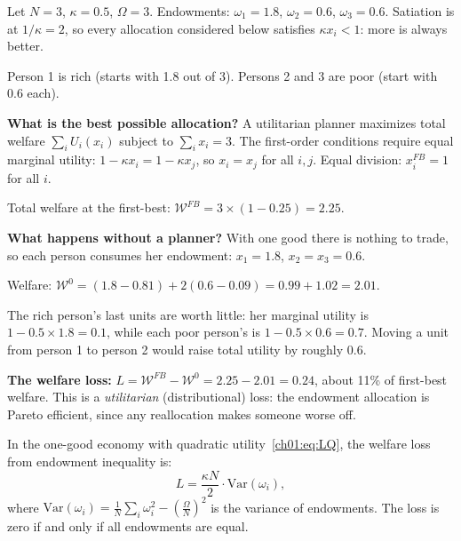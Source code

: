 \documentclass[../structural_economics_book.tex]{subfiles}
\begin{document}
\begin{example}\label{ch01:ex:one_good}
Let $N = 3$, $\kappa = 0.5$, $\Omega = 3$. Endowments: $\omega_1 = 1.8$, $\omega_2 = 0.6$, $\omega_3 = 0.6$. Satiation is at $1/\kappa = 2$, so every allocation considered below satisfies $\kappa x_i < 1$: more is always better.

Person 1 is rich (starts with 1.8 out of 3). Persons 2 and 3 are poor (start with 0.6 each).

\textbf{What is the best possible allocation?} A utilitarian planner maximizes total welfare $\sum_i U_i(x_i)$ subject to $\sum_i x_i = 3$. The first-order conditions require equal marginal utility: $1 - \kappa x_i = 1 - \kappa x_j$, so $x_i = x_j$ for all $i, j$. Equal division: $x_i^{FB} = 1$ for all $i$.

Total welfare at the first-best: $\mathcal{W}^{FB} = 3 \times (1 - 0.25) = 2.25$.

\textbf{What happens without a planner?} With one good there is nothing to trade, so each person consumes her endowment: $x_1 = 1.8$, $x_2 = x_3 = 0.6$.

Welfare: $\mathcal{W}^{0} = (1.8 - 0.81) + 2(0.6 - 0.09) = 0.99 + 1.02 = 2.01$.

The rich person's last units are worth little: her marginal utility is $1 - 0.5 \times 1.8 = 0.1$, while each poor person's is $1 - 0.5 \times 0.6 = 0.7$. Moving a unit from person 1 to person 2 would raise total utility by roughly $0.6$.

\textbf{The welfare loss:} $L = \mathcal{W}^{FB} - \mathcal{W}^{0} = 2.25 - 2.01 = 0.24$, about 11\% of first-best welfare. This is a \textit{utilitarian} (distributional) loss: the endowment allocation is Pareto efficient, since any reallocation makes someone worse off.
\end{example}

\begin{proposition}\label{ch01:prop:welfare_loss}
In the one-good economy with quadratic utility~\eqref{ch01:eq:LQ}, the welfare loss from endowment inequality is:
\begin{equation}\label{ch01:eq:welfare_loss}
L = \frac{\kappa N}{2} \cdot \text{Var}(\omega_i),
\end{equation}
where $\text{Var}(\omega_i) = \frac{1}{N}\sum_i \omega_i^2 - \left(\frac{\Omega}{N}\right)^2$ is the variance of endowments. The loss is zero if and only if all endowments are equal.
\end{proposition}
\end{document}

